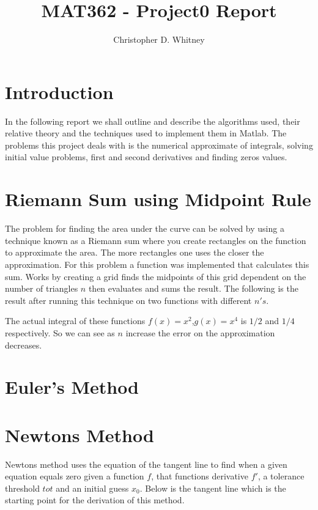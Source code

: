 \documentclass{article}
\begin{document}
\title{MAT362 - Project0 Report}
\author{Christopher D. Whitney}

\maketitle

\section{Introduction}

In the following report we shall outline and describe the algorithms used, their relative theory and the techniques used to implement them in Matlab. The problems this project deals with is the numerical approximate of integrals, solving initial value problems, first and second derivatives and finding zeros values. 

\section{Riemann Sum using Midpoint Rule}
The problem for finding the area under the curve can be solved by using a technique known as a Riemann sum where you create rectangles on the function to approximate the area. The more rectangles one uses the closer the approximation. For this problem a function was implemented that calculates this sum. Works by creating a grid finds the midpoints of this grid dependent on the number of triangles $n$ then evaluates and sums the result. The following is the result after running this technique on two functions with different $n's$. 



The actual integral of these functions $f(x)=x^2$,$g(x) = x^4$ is $1/2$ and $1/4$ respectively. So we can see as $n$ increase the error on the approximation decreases.  
\section{Euler's Method}

\section{Newtons Method}
Newtons method uses the equation of the tangent line to find when a given equation equals zero given a function $f$, that functions derivative $f'$, a tolerance threshold $tot$ and an initial guess $x_0$. Below is the tangent line which is the starting point for the derivation of this method. 
\end{document}
